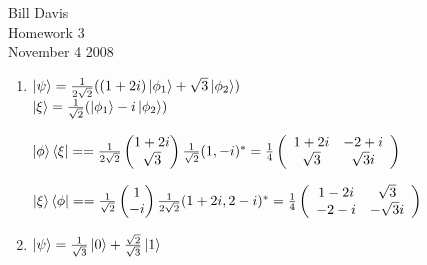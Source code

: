 \documentclass[11pt,fleqn]{article}
\begin{document}
\newcommand{\mbf}[1]{\mbox{{\bfseries #1}}}
\newcommand{\N}{\mbf{N}}
\renewcommand{\O}{\mbf{O}}

\newcommand{\braket}[2]{\left \langle #1 \right. \left | #2 \right \rangle}

\noindent Bill Davis \\
Homework 3 \\
November 4 2008

\begin{enumerate}
\item %
$\left\vert{\psi}\right\rangle= \frac{1}{2\sqrt{2}}((1+2i)\left\vert{\phi_1}\right\rangle+\sqrt{3}\left\vert{\phi_2}\right\rangle)$ \\
$\left\vert{\xi}\right\rangle=\frac{1}{\sqrt{2}}(\left\vert{\phi_1}\right\rangle-i\left\vert{\phi_2}\right\rangle)$

$\left\vert{\phi}\right\rangle\left\langle{\xi}\right\vert = 
=\frac{1}{2\sqrt{2}}\begin{pmatrix}1+2i \\ \sqrt{3} \end{pmatrix} \frac{1}{\sqrt{2}} (1 , -i )^{*} = 
 \frac{1}{4}\left( \begin{array}{cc}
1+2i & -2+i  \\
\sqrt{3} & \sqrt{3}i  \end{array} \right)$

$\left\vert{\xi}\right\rangle\left\langle{\phi}\right\vert = 
=\frac{1}{\sqrt{2}}\begin{pmatrix}1 \\ -i \end{pmatrix} \frac{1}{2\sqrt{2}} (1+2i ,2-i )^{*} = 
 \frac{1}{4}\left( \begin{array}{cc}
1-2i & \sqrt{3}  \\
-2-i & -\sqrt{3}i  \end{array} \right)$

\item %

$\left\vert{\psi}\right\rangle=\frac{1}{\sqrt{3}}\left\vert{0}\right\rangle + \frac{\sqrt{2}}{\sqrt{3}}\left\vert{1}\right\rangle$


\end{enumerate}
\end{document}
